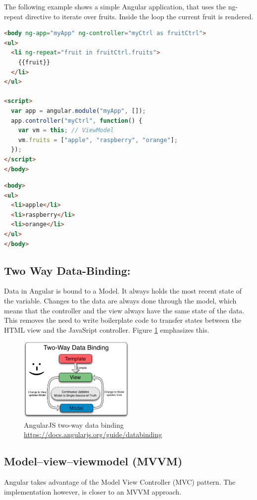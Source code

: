 The following example shows a simple Angular application, that uses the ng-repeat directive to iterate over fruits. Inside the loop the current fruit is rendered.

\begin{lstlisting}[language=html, caption=ng-repeat Angular fruit example, label=lst:angular]
<body ng-app="myApp" ng-controller="myCtrl as fruitCtrl">
<ul>
  <li ng-repeat="fruit in fruitCtrl.fruits">
    {{fruit}}
  </li>
</ul>

<script>
  var app = angular.module("myApp", []);
  app.controller("myCtrl", function() {
    var vm = this; // ViewModel
    vm.fruits = ["apple", "raspberry", "orange"];
  });
</script>
</body>
\end{lstlisting}

\begin{lstlisting}[language=html, caption=ng-repeat Fruit result]
<body>
<ul>
  <li>apple</li>
  <li>raspberry</li>
  <li>orange</li>
</ul>
</body>
\end{lstlisting}


\subsection{Two Way Data-Binding:}
\label{sec:tw-binding}
Data in Angular is bound to a Model. It always holds the most recent state of the variable. Changes to the data are always done through the model, which means that the controller and the view always have the same state of the data. This removes the need to write boilerplate code to transfer states between the HTML view and the JavaSript controller. Figure \ref{fig:tw-databinding} emphasizes this.

\begin{figure}[H]
	\centering\includegraphics[width=0.5\textwidth]{res/Two_Way_Data_Binding}
	\caption{AngularJS two-way data binding \url{https://docs.angularjs.org/guide/databinding}}
	\label{fig:tw-databinding}
\end{figure}


\subsection{Model–view–viewmodel (MVVM)}
Angular takes advantage of the Model View Controller (MVC) pattern. The implementation however, is closer to an MVVM approach. 

